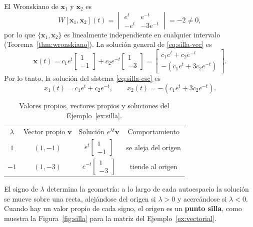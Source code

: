 \begin{example}
El Wronskiano de $\mathbf{x}_1$ y $\mathbf{x}_2$ es
\[
W[\mathbf{x}_1, \mathbf{x}_2](t) =
\begin{vmatrix} e^{t} & e^{-t} \\ - e^{t} & -3e^{-t} \end{vmatrix}
= -2 \neq 0,
\]
por lo que $\{\mathbf{x}_1, \mathbf{x}_2\}$ es linealmente independiente en cualquier intervalo (Teorema~\ref{thm:wronskiano}). La soluci\'on general de \eqref{eq:silla-vec} es
\[
\mathbf{x}(t) = c_1 e^{t}\begin{bmatrix} 1 \\ -1 \end{bmatrix}
+ c_2 e^{-t}\begin{bmatrix} 1 \\ -3 \end{bmatrix}
= \begin{bmatrix} c_1 e^{t} + c_2 e^{-t} \\ -(c_1 e^{t} + 3c_2 e^{-t}) \end{bmatrix}.
\]
Por lo tanto, la soluci\'on del sistema \eqref{eq:silla-esc} es
\[
x_1(t) = c_1 e^{t} + c_2 e^{-t}, \qquad
x_2(t) = -(c_1 e^{t} + 3c_2 e^{-t}).
\]
\end{example}

\begin{table}[H]
\centering
\renewcommand{\arraystretch}{1.4}
\begin{tabular}{c c c c}
\rowcolor{bbe!15}
\textcolor{bbe}{$\lambda$} & \textcolor{bbe}{Vector propio $\mathbf v$} & \textcolor{bbe}{Soluci\'on $e^{\lambda t}\mathbf v$} & \textcolor{bbe}{Comportamiento}\\
$1$ & $(1,-1)$ & $e^{t}\begin{bmatrix}1\\-1\end{bmatrix}$ & se aleja del origen \\
$-1$ & $(1,-3)$ & $e^{-t}\begin{bmatrix}1\\-3\end{bmatrix}$ & tiende al origen \\
\end{tabular}
\caption{Valores propios, vectores propios y soluciones del Ejemplo~\ref{ex:silla}.}
\end{table}

El signo de $\lambda$ determina la geometr\'ia: a lo largo de cada autoespacio la soluci\'on se mueve sobre una recta, alej\'andose del origen si $\lambda>0$ y acerc\'andose si $\lambda<0$. Cuando hay un valor propio de cada signo, el origen es un \textbf{punto silla}, como muestra la Figura~\ref{fig:silla} para la matriz del Ejemplo~\ref{ex:vectorial}.

